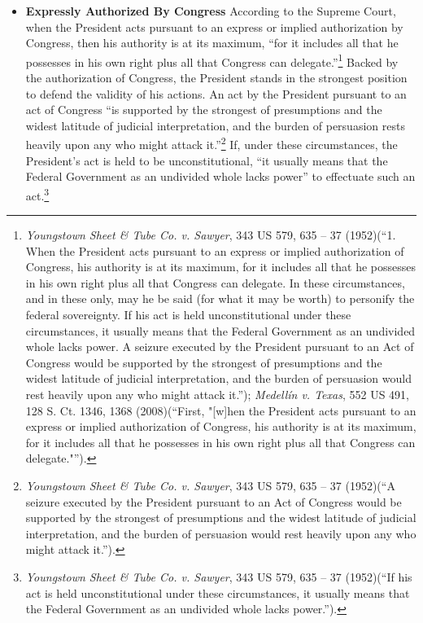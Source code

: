 \begin{itemize}
\item \textbf{Expressly Authorized By Congress} According to the Supreme Court, when the President acts pursuant to an express or implied authorization by Congress, then his authority is at its maximum, ``for it includes all that he possesses in his own right plus all that Congress can delegate.''\footnote{\textit{Youngstown Sheet \& Tube Co. v. Sawyer}, 343 US 579, 635 -- 37 (1952)(``1. When the President acts pursuant to an express or implied authorization of Congress, his authority is at its maximum, for it includes all that he possesses in his own right plus all that Congress can delegate.  In these circumstances, and in these only, may he be said (for what it may be worth) to personify the federal sovereignty. If his act is held unconstitutional under these circumstances, it usually means that the Federal Government as an undivided whole lacks power. A seizure executed by the President pursuant to an Act of Congress would be supported by the strongest of presumptions and the widest latitude of judicial interpretation, and the burden of persuasion would rest heavily upon any who might attack it.''); \textit{Medellín v. Texas}, 552 US 491, 128 S. Ct. 1346, 1368 (2008)(``First, "[w]hen the President acts pursuant to an express or implied authorization of Congress, his authority is at its maximum, for it includes all that he possesses in his own right plus all that Congress can delegate."'').}  Backed by the authorization of Congress, the President stands in the strongest position to defend the validity of his actions.  
An act by the President pursuant to an act of Congress ``is supported by the strongest of presumptions and the widest latitude of judicial interpretation, and the burden of persuasion rests heavily upon any who might attack it.''\footnote{\textit{Youngstown Sheet \& Tube Co. v. Sawyer}, 343 US 579, 635 -- 37 (1952)(``A seizure executed by the President pursuant to an Act of Congress would be supported by the strongest of presumptions and the widest latitude of judicial interpretation, and the burden of persuasion would rest heavily upon any who might attack it.'').}
If, under these circumstances, the President's act is held to be unconstitutional, ``it usually means that the Federal Government as an undivided whole lacks power'' to effectuate such an act.\footnote{\textit{Youngstown Sheet \& Tube Co. v. Sawyer}, 343 US 579, 635 -- 37 (1952)(``If his act is held unconstitutional under these circumstances, it usually means that the Federal Government as an undivided whole lacks power.'').}


\end{itemize}

